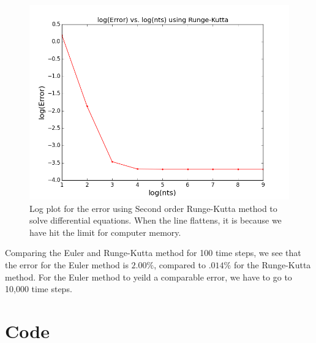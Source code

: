 \documentclass[11pt]{article}
\begin{document}
\begin{figure}[ht]
\centering
\includegraphics[scale=.5]{rkerrorplot.png}
\caption{Log plot for the error using Second order Runge-Kutta method to solve differential equations. When the line flattens, it is because we have hit the limit for computer memory.  }
\end{figure}

Comparing the Euler and Runge-Kutta method for 100 time steps, we see that the error for the Euler method is $2.00\%$, compared to $.014\%$ for the Runge-Kutta method. For the Euler method to yeild a comparable error, we have to go to 10,000 time steps. 


\section{Code}
\end{document}
